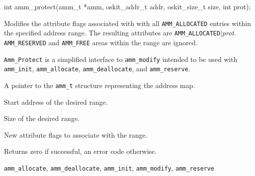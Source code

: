 \begin{apisyn}

	\funcproto int amm_protect(amm_t *amm,
			oskit_addr_t addr, oskit_size_t size, int prot);
\end{apisyn}
\begin{apidesc}
	Modifies the attribute flags associated with with all
	{\tt AMM_ALLOCATED} entries within the specified address range.
	The resulting attributes are {\tt AMM_ALLOCATED}$|$\emph{prot}.
	{\tt AMM_RESERVED} and {\tt AMM_FREE} areas within the range
	are ignored.

	{\tt Amm_Protect} is a simplified interface to {\tt amm_modify}
	intended to be used with {\tt amm_init}, {\tt amm_allocate},
	{\tt amm_deallocate}, and {\tt amm_reserve}.
\end{apidesc}
\begin{apiparm}
	\item[amm]
		A pointer to the {\tt amm_t} structure
		representing the address map.
	\item[addr]
		Start address of the desired range.
	\item[size]
		Size of the desired range.
	\item[prot]
		New attribute flags to associate with the range.
\end{apiparm}
\begin{apiret}
	Returns zero if successful, an error code otherwise.
\end{apiret}
\begin{apirel}
	{\tt amm_allocate}, {\tt amm_deallocate}, {\tt amm_init},
	{\tt amm_modify}, {\tt amm_reserve}
\end{apirel}


